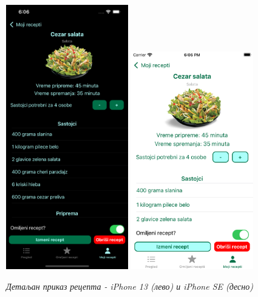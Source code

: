 \documentclass[12pt,oneside]{memoir}
\begin{document}
\begin{figure} [H]
    \centering
    \captionsetup{justification=centering}
    \includegraphics[width=0.475\textwidth]{images/simulators/view images/dark - detail4.png} 
    \hfill
    \includegraphics[width=0.475\textwidth]{images/simulators/view images/light - detail4.png} 
    \caption{\textit{Детаљан приказ рецепта - iPhone 13 (лево) и iPhone SE (десно)}}
    \label{slika:детаљан_рецепт_1}
\end{figure}
\end{document}
